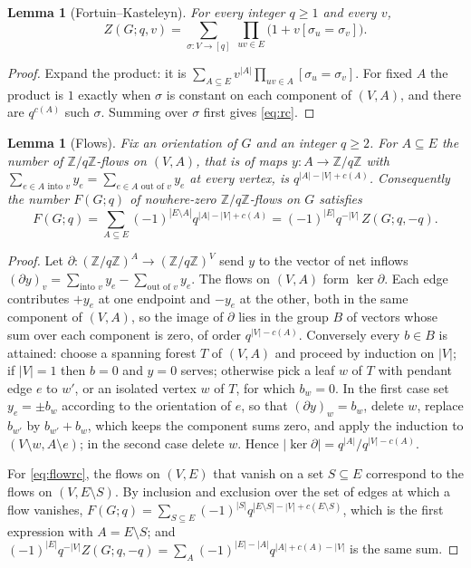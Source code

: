 \documentclass[11pt,reqno]{amsart}
\numberwithin{equation}{section}
\theoremstyle{plain}
\newtheorem{lemma}[theorem]{Lemma}
\theoremstyle{definition}
\theoremstyle{remark}
\newcommand{\Z}{\mathbb{Z}}
\begin{document}
\begin{lemma}[Fortuin--Kasteleyn]\label{lem:fk}
For every integer $q\ge1$ and every $v$,
\[
  Z(G;q,v)=\sum_{\sigma:V\to[q]}\ \prod_{uv\in E}\bigl(1+v[\sigma_u=\sigma_v]\bigr).
\]
\end{lemma}

\begin{proof}
Expand the product: it is $\sum_{A\subseteq E}v^{|A|}\prod_{uv\in A}[\sigma_u=\sigma_v]$.
For fixed $A$ the product is $1$ exactly when $\sigma$ is constant on each
component of $(V,A)$, and there are $q^{c(A)}$ such $\sigma$. Summing over
$\sigma$ first gives \eqref{eq:rc}.
\end{proof}

\begin{lemma}[Flows]\label{lem:flows}
Fix an orientation of $G$ and an integer $q\ge2$. For $A\subseteq E$ the number
of $\Z/q\Z$-flows on $(V,A)$, that is of maps $y:A\to\Z/q\Z$ with
$\sum_{e\in A\text{ into }v}y_e=\sum_{e\in A\text{ out of }v}y_e$ at every
vertex, is $q^{|A|-|V|+c(A)}$. Consequently the number $F(G;q)$ of nowhere-zero
$\Z/q\Z$-flows on $G$ satisfies
\begin{equation}\label{eq:flowrc}
  F(G;q)=\sum_{A\subseteq E}(-1)^{|E\setminus A|}q^{|A|-|V|+c(A)}
  =(-1)^{|E|}q^{-|V|}\,Z(G;q,-q).
\end{equation}
\end{lemma}

\begin{proof}
Let $\partial:(\Z/q\Z)^A\to(\Z/q\Z)^V$ send $y$ to the vector of net inflows
$(\partial y)_v=\sum_{\text{into }v}y_e-\sum_{\text{out of }v}y_e$. The flows on
$(V,A)$ form $\ker\partial$. Each edge contributes $+y_e$ at one endpoint and
$-y_e$ at the other, both in the same component of $(V,A)$, so the image of
$\partial$ lies in the group $B$ of vectors whose sum over each component is
zero, of order $q^{|V|-c(A)}$. Conversely every $b\in B$ is attained: choose a
spanning forest $T$ of $(V,A)$ and proceed by induction on $|V|$; if $|V|=1$ then
$b=0$ and $y=0$ serves; otherwise pick a leaf $w$ of $T$ with pendant edge $e$
to $w'$, or an isolated vertex $w$ of $T$, for which $b_w=0$. In the first case
set $y_e=\pm b_w$ according to the orientation of $e$, so that $(\partial y)_w=b_w$,
delete $w$, replace $b_{w'}$ by $b_{w'}+b_w$, which keeps the component sums
zero, and apply the induction to $(V\setminus w,A\setminus e)$; in the second
case delete $w$. Hence $|\ker\partial|=q^{|A|}/q^{|V|-c(A)}$.

For \eqref{eq:flowrc}, the flows on $(V,E)$ that vanish on a set $S\subseteq E$
correspond to the flows on $(V,E\setminus S)$. By inclusion and exclusion over
the set of edges at which a flow vanishes,
$F(G;q)=\sum_{S\subseteq E}(-1)^{|S|}q^{|E\setminus S|-|V|+c(E\setminus S)}$,
which is the first expression with $A=E\setminus S$; and
$(-1)^{|E|}q^{-|V|}Z(G;q,-q)=\sum_A(-1)^{|E|-|A|}q^{|A|+c(A)-|V|}$ is the same
sum.
\end{proof}
\end{document}
